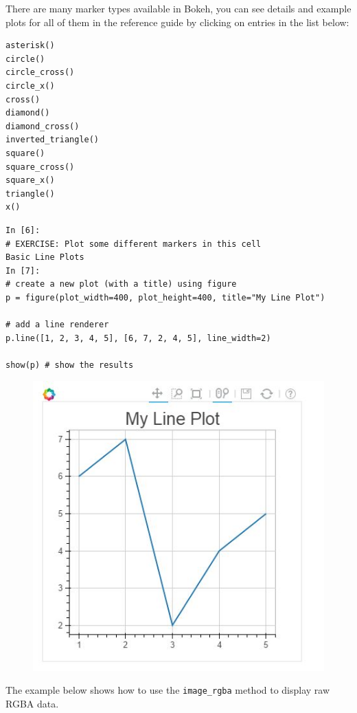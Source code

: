 \documentclass[a4paper,12pt]{article}
\begin{document}
There are many marker types available in Bokeh, you can see details and example plots for all of them in the reference guide by clicking on entries in the list below:
\begin{framed}
\begin{verbatim}
asterisk()
circle()
circle_cross()
circle_x()
cross()
diamond()
diamond_cross()
inverted_triangle()
square()
square_cross()
square_x()
triangle()
x()
\end{verbatim}
\end{framed}
\begin{framed}
	\begin{verbatim}
In [6]:
# EXERCISE: Plot some different markers in this cell
Basic Line Plots
In [7]:
# create a new plot (with a title) using figure
p = figure(plot_width=400, plot_height=400, title="My Line Plot")

# add a line renderer
p.line([1, 2, 3, 4, 5], [6, 7, 2, 4, 5], line_width=2)

show(p) # show the results
\end{verbatim}
\end{framed}
\begin{figure}[h!]
\centering
\includegraphics[width=0.7\linewidth]{images/01-BasicPlot-LinePlot}
\caption{}
\label{fig:01-BasicPlot-LinePlot}
\end{figure}

The example below shows how to use the \texttt{image\_rgba} method to display raw RGBA data.
\end{document}

